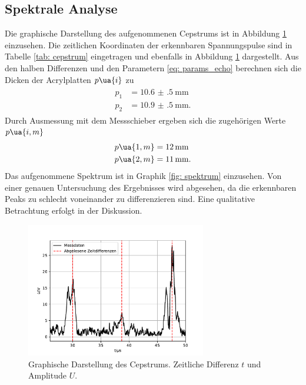 \subsection{Spektrale Analyse}
Die graphische Darstellung des aufgenommenen Cepstrums ist in Abbildung \ref{fig: cepstrum} einzusehen.
Die zeitlichen Koordinaten der erkennbaren Spannungspulse sind in Tabelle \ref{tab: cepstrum} eingetragen und ebenfalls in
Abbildung \ref{fig: cepstrum} dargestellt. Aus den halben Differenzen und den Parametern \ref{eq: params_echo} berechnen sich die
Dicken der Acrylplatten $p\ua{i}$ zu
\begin{align}
  \begin{aligned}
    p_1 &= \SI{+10.6(5)}{\milli\meter} \\
    p_2 &= \SI{+10.9(5)}{\milli\meter}.
    \label{eq: platten_cepstrum}
  \end{aligned}
\end{align}
Durch Ausmessung mit dem Messschieber ergeben sich die zugehörigen Werte $p\ua{i, m}$
\begin{align}
  \begin{aligned}
    p\ua{1, m} &= \SI{+12}{\milli\meter}\\
    p\ua{2, m} &= \SI{+11}{\milli\meter}.
    \label{eq: platten_messschieber}
  \end{aligned}
\end{align}
Das aufgenommene Spektrum ist in Graphik \ref{fig: spektrum} einzusehen. Von einer genauen Untersuchung des Ergebnisses wird abgesehen, da
die erkennbaren Peaks zu schlecht voneinander zu differenzieren sind. Eine qualitative Betrachtung erfolgt in der Diskussion.

\begin{figure}[H]
  \centering
  \includegraphics[width = 0.7\textwidth]{../Messdaten/plots/cepstrum.pdf}
  \caption{Graphische Darstellung des Cepstrums. Zeitliche Differenz $t$ und Amplitude $U$.}
  \label{fig: cepstrum}
\end{figure}

